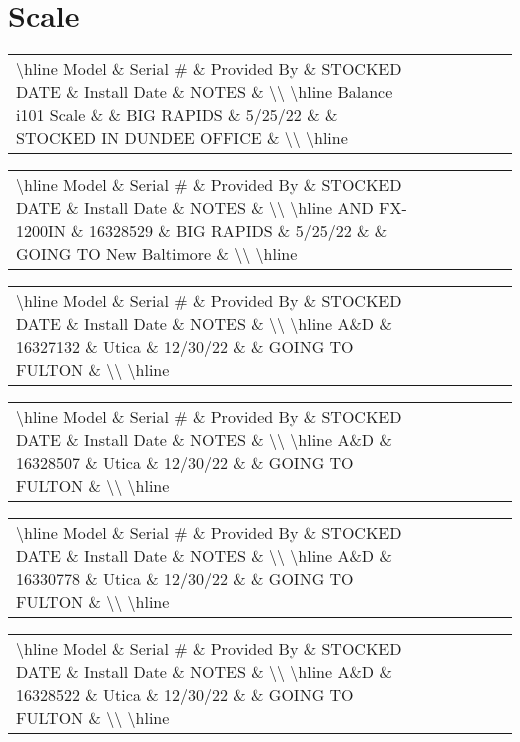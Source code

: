 \documentclass{article}%
\begin{document}
\section{Scale}%
\label{sec:Scale}%
\begin{tabularx}{\textwidth}{|X|X|X|X|X|X|X|}%
\textbackslash{}hline%
Model \& Serial \# \& Provided By \& STOCKED DATE \& Install Date \& NOTES \&  \textbackslash{}\textbackslash{}%
\textbackslash{}hline%
Balance i101 Scale \&  \& BIG RAPIDS \& 5/25/22 \&  \& STOCKED IN DUNDEE OFFICE \&  \textbackslash{}\textbackslash{}%
\textbackslash{}hline%
\end{tabularx}%
\begin{tabularx}{\textwidth}{|X|X|X|X|X|X|X|}%
\textbackslash{}hline%
Model \& Serial \# \& Provided By \& STOCKED DATE \& Install Date \& NOTES \&  \textbackslash{}\textbackslash{}%
\textbackslash{}hline%
AND FX{-}1200IN \& 16328529 \& BIG RAPIDS \& 5/25/22 \&  \& GOING TO New Baltimore \&  \textbackslash{}\textbackslash{}%
\textbackslash{}hline%
\end{tabularx}%
\begin{tabularx}{\textwidth}{|X|X|X|X|X|X|X|}%
\textbackslash{}hline%
Model \& Serial \# \& Provided By \& STOCKED DATE \& Install Date \& NOTES \&  \textbackslash{}\textbackslash{}%
\textbackslash{}hline%
A\&D \& 16327132 \& Utica \& 12/30/22 \&  \& GOING TO FULTON \&  \textbackslash{}\textbackslash{}%
\textbackslash{}hline%
\end{tabularx}%
\begin{tabularx}{\textwidth}{|X|X|X|X|X|X|X|}%
\textbackslash{}hline%
Model \& Serial \# \& Provided By \& STOCKED DATE \& Install Date \& NOTES \&  \textbackslash{}\textbackslash{}%
\textbackslash{}hline%
A\&D \& 16328507 \& Utica \& 12/30/22 \&  \& GOING TO FULTON \&  \textbackslash{}\textbackslash{}%
\textbackslash{}hline%
\end{tabularx}%
\begin{tabularx}{\textwidth}{|X|X|X|X|X|X|X|}%
\textbackslash{}hline%
Model \& Serial \# \& Provided By \& STOCKED DATE \& Install Date \& NOTES \&  \textbackslash{}\textbackslash{}%
\textbackslash{}hline%
A\&D \& 16330778 \& Utica \& 12/30/22 \&  \& GOING TO FULTON \&  \textbackslash{}\textbackslash{}%
\textbackslash{}hline%
\end{tabularx}%
\begin{tabularx}{\textwidth}{|X|X|X|X|X|X|X|}%
\textbackslash{}hline%
Model \& Serial \# \& Provided By \& STOCKED DATE \& Install Date \& NOTES \&  \textbackslash{}\textbackslash{}%
\textbackslash{}hline%
A\&D \& 16328522 \& Utica \& 12/30/22 \&  \& GOING TO FULTON \&  \textbackslash{}\textbackslash{}%
\textbackslash{}hline%
\end{tabularx}%
\end{document}
